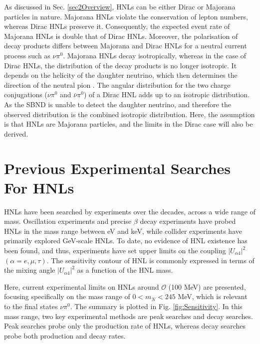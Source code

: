 As discussed in Sec. \ref{sec2Overview}, HNLs can be either Dirac or Majorana particles in nature.
Majorana HNLs violate the conservation of lepton numbers, whereas Dirac HNLs preserve it.
Consequently, the expected event rate of Majorana HNLs is double that of Dirac HNLs.
Moreover, the polarisation of decay products differs between Majorana and Dirac HNLs for a neutral current process such as $\nu\pi^{0}$.
Majorana HNLs decay isotropically, whereas in the case of Dirac HNLs, the distribution of the decay products is no longer isotropic.
It depends on the helicity of the daughter neutrino, which then determines the direction of the neutral pion \cite{HNLSilvia}.
The angular distribution for the two charge conjugations ($\nu\pi^{0}$ and $\bar{\nu}\pi^{0}$) of a Dirac HNL adds up to an isotropic distribution.
As the SBND is unable to detect the daughter neutrino, and therefore the observed distribution is the combined isotropic distribution. 
Here, the assumption is that HNLs are Majorana particles, and the limits in the Dirac case will also be derived.

\section{Previous Experimental Searches For HNLs}
\label{sec2Previous}


HNLs have been searched by experiments over the decades, across a wide range of mass.
Oscillation experiments and precise $\beta$ decay experiments have probed HNLs in the mass range between eV and keV, while collider experiments have primarily explored GeV-scale HNLs.
To date, no evidence of HNL existence has been found, and thus, experiments have set upper limits on the coupling $|U_{\alpha4}|^{2}$ $(\alpha=e,\mu,\tau)$.
The sensitivity contour of HNL is commonly expressed in terms of the mixing angle $|U_{\alpha4}|^{2}$ as a function of the HNL mass.

Here, current experimental limits on HNLs around $\mathcal{O}$ (100 MeV) are presented, focusing specifically on the mass range of $ 0 < m_{N} < 245 $ MeV, which is relevant to the final states $\nu\pi^{0}$.
The summary is plotted in Fig. \ref{fig:Sensitivity}.
In this mass range, two key experimental methods are peak searches and decay searches.
Peak searches probe only the production rate of HNLs, whereas decay searches probe both production and decay rates.


